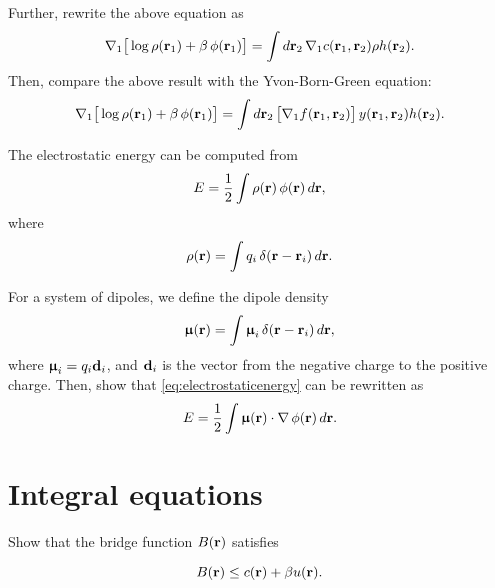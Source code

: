 \documentclass[12pt]{book}
\begin{document}


Further, rewrite the above equation as
%
\[
   \nabla_1
   \big[
     \log \rho(\vr_1) + \beta \, \phi(\vr_1)
   \big]
  =
 \int d \vr_2 \,
    \nabla_1 c(\vr_1, \vr_2)
    \rho h(\vr_2).
\]
%
Then, compare the above result with the Yvon-Born-Green equation:
%
\begin{align}
   \nabla_1
   \big[
     \log \rho(\vr_1) + \beta \, \phi(\vr_1)
   \big]
  =
 \int d \vr_2 \,
    \big[ \nabla_1 f(\vr_1, \vr_2) \big]
    \, y(\vr_1, \vr_2)
    h(\vr_2).
\end{align}





The electrostatic energy can be computed from
\begin{equation}
  E = \frac{1}{2} \int \rho(\vr) \, \phi(\vr) \, d\vr,
  \label{eq:electrostaticenergy}
\end{equation}
where
\[
  \rho(\vr) = \int q_i \, \delta(\vr - \vr_i) \, d\vr.
\]

For a system of dipoles, we define the dipole density
\[
  \vct\upmu(\vr) = \int \vct\upmu_i \, \delta(\vr - \vr_i) \, d\vr,
\]
where $\vct\upmu_i = q_i \vct{d}_i$,
and $\vct{d}_i$ is the vector from the negative charge to the positive charge.
%
Then, show that \eqref{eq:electrostaticenergy} can be rewritten as
\[
  E = \frac{1}{2} \int \vct\upmu(\vr) \cdot \nabla \, \phi(\vr) \, d\vr.
\]







\chapter{Integral equations}


Show that the bridge function $B(\vr)$ satisfies\cite{kast2012}

\begin{equation}
  B(\vr) \le c(\vr) + \beta u(\vr).
\end{equation}

\end{document}
